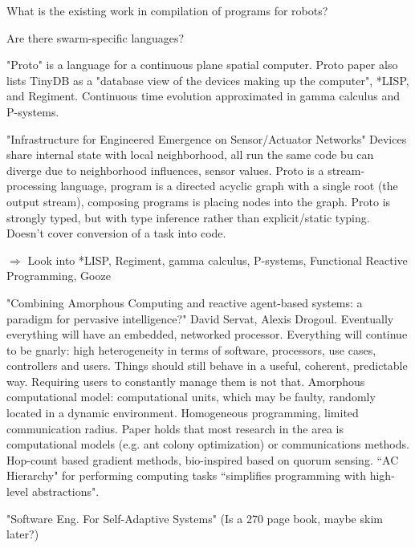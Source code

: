 \documentclass[]{article}
\begin{document}
What is the existing work in compilation of programs for robots? 

Are there swarm-specific languages? 

"Proto" is a language for a continuous plane spatial computer. Proto paper also lists TinyDB as a "database view of the devices making up the computer", *LISP, and Regiment. Continuous time evolution approximated in gamma calculus and P-systems. 

"Infrastructure for Engineered Emergence on Sensor/Actuator Networks" \cite{beal2006infrastructure} Devices share internal state with local neighborhood, all run the same code bu can diverge due to neighborhood influences, sensor values. Proto is a stream-processing language, program is a directed acyclic graph with a single root (the output stream), composing programs is placing nodes into the graph. Proto is strongly typed, but with type inference rather than explicit/static typing. Doesn't cover conversion of a task into code. 

$\Rightarrow$ Look into *LISP, Regiment, gamma calculus, P-systems, Functional Reactive Programming, Gooze

"Combining Amorphous Computing and reactive agent-based systems: a paradigm for pervasive intelligence?" David Servat, Alexis Drogoul. Eventually everything will have an embedded, networked processor. Everything will continue to be gnarly: high heterogeneity in terms of software, processors, use cases, controllers and users. Things should still behave in a useful, coherent, predictable way. Requiring users to constantly manage them is not that. Amorphous computational model: computational units, which may be faulty, randomly located in a dynamic environment. Homogeneous programming, limited communication radius. Paper holds that most research in the area is computational models (e.g. ant colony optimization) or communications methods. Hop-count based gradient methods, bio-inspired based on quorum sensing. ``AC Hierarchy" for performing computing tasks ``simplifies programming with high-level abstractions". 

"Software Eng. For Self-Adaptive Systems" (Is a 270 page book, maybe skim later?)
\end{document}
